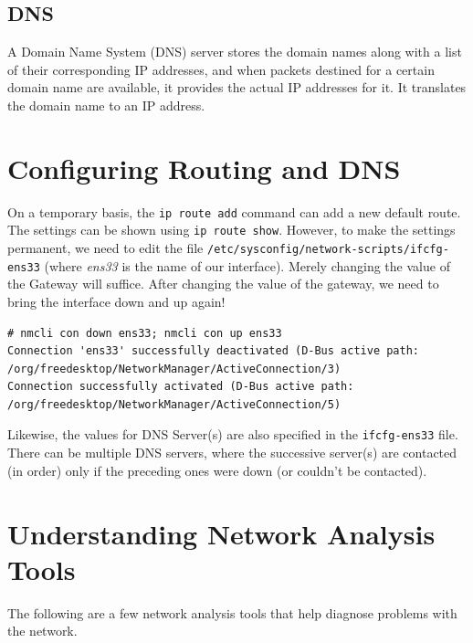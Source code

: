 \subsection{DNS}
A Domain Name System (DNS) server stores the domain names along with a list of their corresponding IP addresses, and when packets destined for a certain domain name are available, it provides the actual IP addresses for it. It translates the domain name to an IP address.

\section{Configuring Routing and DNS} 
On a temporary basis, the \verb|ip route add| command can add a new default route. The settings can be shown using \verb|ip route show|. However, to make the settings permanent, we need to edit the file \verb|/etc/sysconfig/network-scripts/ifcfg-ens33| (where \textit{ens33} is the name of our interface). Merely changing the value of the Gateway will suffice. After changing the value of the gateway, we need to bring the interface down and up again!

\vspace{-15pt}
\begin{verbatim}
# nmcli con down ens33; nmcli con up ens33
Connection 'ens33' successfully deactivated (D-Bus active path: /org/freedesktop/NetworkManager/ActiveConnection/3)
Connection successfully activated (D-Bus active path: /org/freedesktop/NetworkManager/ActiveConnection/5)
\end{verbatim}
\vspace{-10pt}

Likewise, the values for DNS Server(s) are also specified in the \verb|ifcfg-ens33| file. There can be multiple DNS servers, where the successive server(s) are contacted (in order) only if the preceding ones were down (or couldn't be contacted). 

	\section{Understanding Network Analysis Tools}
The following are a few network analysis tools that help diagnose problems with the network. 

